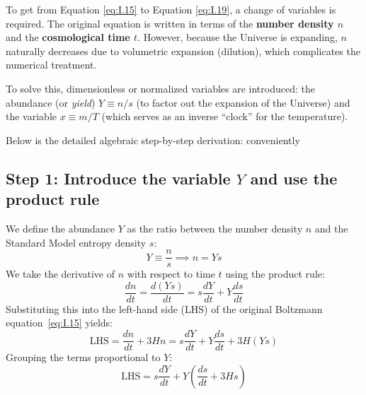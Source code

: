 \documentclass[11pt,a4paper]{article}
\begin{document}
To get from Equation \eqref{eq:I.15} to Equation \eqref{eq:I.19}, a change of variables is required. The original equation is written in terms of the \textbf{number density $n$} and the \textbf{cosmological time $t$}. However, because the Universe is expanding, $n$ naturally decreases due to volumetric expansion (dilution), which complicates the numerical treatment. 

To solve this, dimensionless or normalized variables are introduced: the abundance (or \textit{yield}) \textbf{$Y \equiv n/s$} (to factor out the expansion of the Universe) and the variable \textbf{$x \equiv m/T$} (which serves as an inverse ``clock'' for the temperature).

Below is the detailed algebraic step-by-step derivation:
conveniently
\subsection*{Step 1: Introduce the variable $Y$ and use the product rule}
We define the abundance $Y$ as the ratio between the number density $n$ and the Standard Model entropy density $s$:
\begin{equation}
    Y \equiv \frac{n}{s} \implies n = Y s
\end{equation}
We take the derivative of $n$ with respect to time $t$ using the product rule:
\begin{equation}
    \frac{dn}{dt} = \frac{d(Y s)}{dt} = s \frac{dY}{dt} + Y \frac{ds}{dt}
\end{equation}
Substituting this into the left-hand side (LHS) of the original Boltzmann equation~\eqref{eq:I.15} yields:
\begin{equation}
    \text{LHS} = \frac{dn}{dt} + 3Hn = s \frac{dY}{dt} + Y \frac{ds}{dt} + 3H(Y s)
\end{equation}
Grouping the terms proportional to $Y$:
\begin{equation}
    \text{LHS} = s \frac{dY}{dt} + Y \left( \frac{ds}{dt} + 3Hs \right)
\end{equation}
\end{document}
